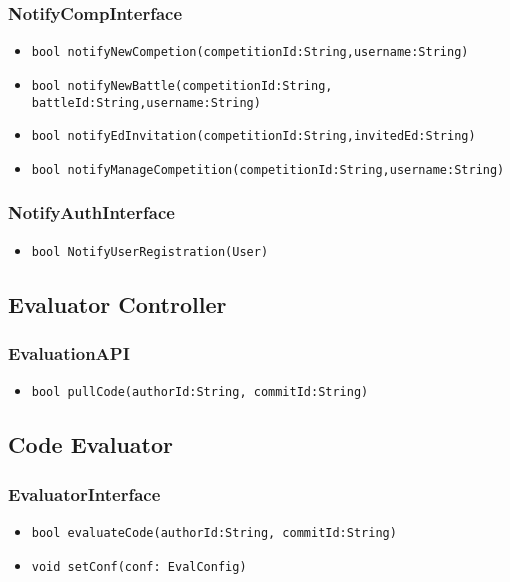 \subsubsection{NotifyCompInterface}
\begin{itemize}
    \item \texttt{bool notifyNewCompetion(competitionId:String,username:String)}
    \item \texttt{bool notifyNewBattle(competitionId:String, battleId:String,username:String)}
    \item \texttt{bool notifyEdInvitation(competitionId:String,invitedEd:String)}%
    \item \texttt{bool notifyManageCompetition(competitionId:String,username:String)}
\end{itemize}

\subsubsection{NotifyAuthInterface}
\begin{itemize}
    \item \texttt{bool NotifyUserRegistration(User)}%
\end{itemize}

\subsection{Evaluator Controller}
\subsubsection{EvaluationAPI}
\begin{itemize}
    \item \texttt{bool pullCode(authorId:String, commitId:String)}
\end{itemize}

\subsection{Code Evaluator}
\subsubsection{EvaluatorInterface}
\begin{itemize}
    \item \texttt{bool evaluateCode(authorId:String, commitId:String)}
    \item \texttt{void setConf(conf: EvalConfig)}
\end{itemize}

